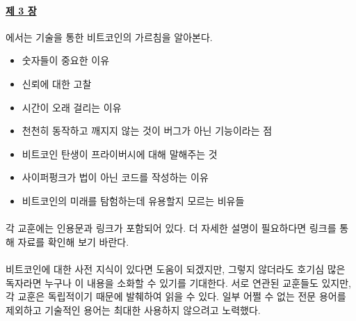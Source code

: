 \paragraph{\hyperref[ch:technology]{제 3 장}}{에서는 기술을 통한 비트코인의 가르침을 알아본다.
\begin{itemize}
	\item 숫자들이 중요한 이유
	\item 신뢰에 대한 고찰
	\item 시간이 오래 걸리는 이유
	\item 천천히 동작하고 깨지지 않는 것이 버그가 아닌 기능이라는 점
	\item 비트코인 탄생이 프라이버시에 대해 말해주는 것
	\item 사이퍼펑크가 법이 아닌 코드를 작성하는 이유
	\item 비트코인의 미래를 탐험하는데 유용할지 모르는 비유들
	\end{itemize}}
	

\paragraph{}
각 교훈에는 인용문과 링크가 포함되어 있다. 더 자세한 설명이 필요하다면 링크를 통해 자료를 확인해 보기
바란다.

\paragraph{}
비트코인에 대한 사전 지식이 있다면 도움이 되겠지만, 
그렇지 않더라도 호기심 많은 독자라면 누구나 이 내용을 소화할 수 있기를 기대한다.
서로 연관된 교훈들도 있지만, 각 교훈은 독립적이기 때문에 발췌하여 읽을 수 있다. 
일부 어쩔 수 없는 전문 용어를 제외하고 기술적인 용어는 최대한 사용하지 않으려고 노력했다. 

